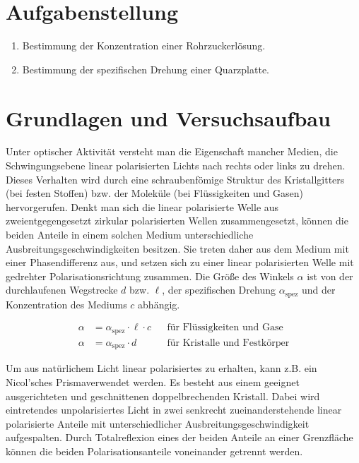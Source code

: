 \documentclass{article}
\newcommand{\as}{\alpha_\text{spez}}
\begin{document}
\parindent0cm

%


\pagestyle{fancy}

\section{Aufgabenstellung}

\begin{enumerate}
\item Bestimmung der Konzentration einer Rohrzuckerlösung.
\item Bestimmung der spezifischen Drehung einer Quarzplatte.
\end{enumerate}

\section{Grundlagen und Versuchsaufbau}

Unter optischer Aktivität versteht man die Eigenschaft mancher Medien, die Schwingungsebene linear polarisierten Lichts nach rechts oder links zu drehen. Dieses Verhalten wird durch eine schraubenfömige Struktur des Kristallgitters (bei festen Stoffen) bzw. der Moleküle (bei Flüssigkeiten und Gasen) hervorgerufen. Denkt man sich die linear polarisierte Welle aus zweientgegengesetzt zirkular polarisierten Wellen zusammengesetzt, können die beiden Anteile in einem solchen Medium unterschiedliche Ausbreitungsgeschwindigkeiten besitzen. Sie treten daher aus dem Medium mit einer Phasendifferenz aus, und setzen sich zu einer linear polarisierten Welle mit gedrehter Polarisationsrichtung zusammen. Die Größe des Winkels $\alpha$ ist von der durchlaufenen Wegstrecke $d$ bzw. $\ell$, der spezifischen Drehung $\as$ und der Konzentration des Mediums $c$ abhängig.

\begin{equation}
\label{eq:main}
\begin{aligned}
  \alpha &= \as\cdot \ell \cdot c && \text{für Flüssigkeiten und Gase} \\
  \alpha &= \as\cdot d && \text{für Kristalle und Festkörper}
\end{aligned}
\end{equation}

Um aus natürlichem Licht linear polarisiertes zu erhalten, kann z.B. ein Nicol'sches Prismaverwendet werden. Es besteht aus einem geeignet ausgerichteten und geschnittenen doppelbrechenden Kristall. Dabei wird eintretendes unpolarisiertes Licht in zwei senkrecht zueinanderstehende linear polarisierte Anteile mit unterschiedlicher Ausbreitungsgeschwindigkeit aufgespalten. Durch Totalreflexion eines der beiden Anteile an einer Grenzfläche können die beiden Polarisationsanteile voneinander getrennt werden.
\end{document}
